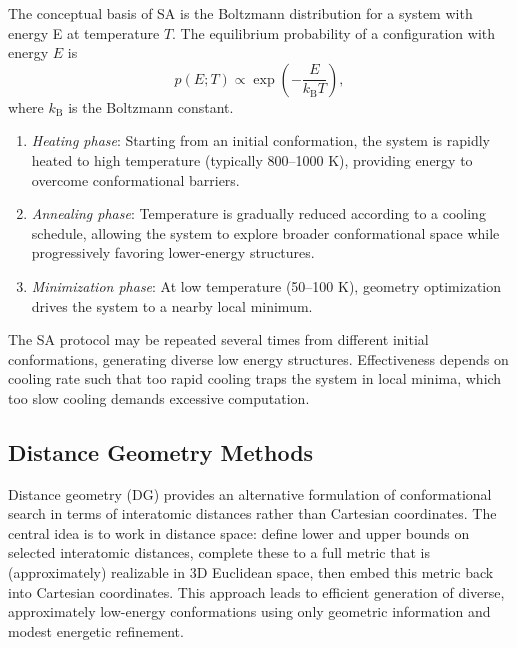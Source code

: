 \documentclass[12pt]{article}
\begin{document}
The conceptual basis of SA is the Boltzmann distribution for a system with energy E at temperature \(T\). 
The equilibrium probability of a configuration with energy \(E\) is
\begin{equation}
    p(E;T) \propto \exp\!\left(-\frac{E}{k_{\mathrm{B}} T}\right),
\end{equation}
where \(k_{\mathrm{B}}\) is the Boltzmann constant. 



\begin{enumerate}
\item \textit{Heating phase}: Starting from an initial conformation, the system is rapidly heated to high temperature (typically 800--1000 K), providing energy to overcome conformational barriers.
\item \textit{Annealing phase}: Temperature is gradually reduced according to a cooling schedule, allowing the system to explore broader conformational space while progressively favoring lower-energy structures.
\item \textit{Minimization phase}: At low temperature (50--100 K), geometry optimization drives the system to a nearby local minimum.
\end{enumerate}

The SA protocol may be repeated several times from different initial conformations, generating diverse low energy structures. Effectiveness depends on cooling rate such that too rapid cooling traps the system in local minima, which too slow cooling demands excessive computation.

\subsection{Distance Geometry Methods}

Distance geometry (DG) provides an alternative formulation of conformational search in terms of interatomic distances rather than Cartesian coordinates.\cite{CH2_crippen_havel_book,CH2_havel_kuntz_crippen_1983,CH2_crippen_chem_dg_1991} The central idea is to work in distance space: define lower and upper bounds on selected interatomic distances, complete these to a full metric that is (approximately) realizable in 3D Euclidean space, then embed this metric back into Cartesian coordinates. This approach leads to efficient generation of diverse, approximately low-energy conformations using only geometric information and modest energetic refinement.\cite{CH2_spellmeyer_dg_conf_1997,CH2_riniker_landrum_2015}
\end{document}
